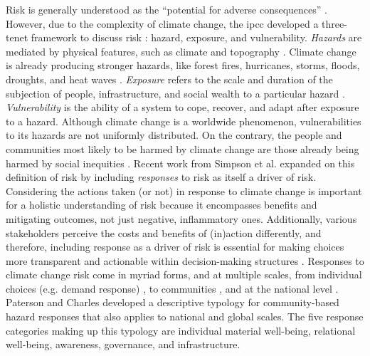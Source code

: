 Risk is generally understood as the ``potential for adverse consequences''
\cite{reisinger_concept_2020}. However, due to the complexity of climate change,
the \ac{ipcc} developed a three-tenet framework to discuss risk
\cite{reisinger_concept_2020}: hazard, exposure, and vulnerability.
\textit{Hazards} are mediated by physical features, such as climate and
topography \cite{dorkenoo_critical_2022, simpson_framework_2021}.  Climate
change is already producing stronger hazards, like forest fires, hurricanes,
storms, floods, droughts, and heat waves \cite{reidmiller_fourth_2018,
intergovernmental_panel_on_climate_change_climate_2021, dahl_killer_2019}.
\textit{Exposure} refers to the scale and duration of the subjection of people,
infrastructure, and social wealth to a particular hazard
\cite{simpson_framework_2021,reisinger_concept_2020,li_understanding_2021}.
\textit{Vulnerability} is the ability of a system to cope, recover, and adapt
after exposure to a hazard. Although climate change is a worldwide phenomenon,
vulnerabilities to its hazards are not uniformly distributed. On the contrary,
the people and communities most likely to be harmed by climate change are those
already being harmed by social inequities \cite{islam_climate_2017}. Recent work
from Simpson et al. \cite{simpson_framework_2021} expanded on this definition of
risk by including \textit{responses} to risk as itself a driver of risk.
Considering the actions taken (or not) in response to climate change is
important for a holistic understanding of risk because it encompasses benefits
and mitigating outcomes, not just negative, inflammatory ones. Additionally,
various stakeholders perceive the costs and benefits of (in)action differently,
and therefore, including response as a driver of risk is essential for making
choices more transparent and actionable within decision-making structures
\cite{simpson_framework_2021}. Responses to climate change risk come in myriad
forms,  and at multiple scales, from individual choices (e.g. demand response)
\cite{seck_embedding_2020,rinaldi_what_2022, dehghanpour_agent-based_2018}, to
communities \cite{paterson_community-based_2019, elmallah_frontlining_2022}, and
at the national level \cite{roelfsema_taking_2020, fawzy_strategies_2020}.
Paterson and Charles \cite{paterson_community-based_2019} developed a
descriptive typology for community-based hazard responses that also applies to
national and global scales. The five response categories making up this typology
are individual material well-being, relational well-being, awareness,
governance, and infrastructure.

